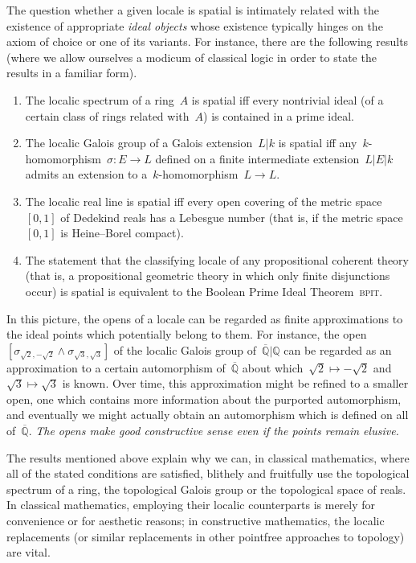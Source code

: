 \documentclass{ws-rv9x6}
\newcommand{\QQ}{\mathbb{Q}}
\renewcommand{\_}{\mathpunct{.}}
\newcommand{\?}{\,{:}\,}
\newcommand{\BPIT}{\textsc{bpit}\xspace}
\begin{document}
The question whether a given locale is spatial is intimately related with the
existence of appropriate \emph{ideal objects} whose existence typically hinges
on the axiom of choice or one of its variants. For instance, there are the
following results (where we allow ourselves a modicum of classical logic in
order to state the results in a familiar form).
\begin{enumerate}
\item The localic spectrum of a ring~$A$ is spatial iff every nontrivial ideal
(of a certain class of rings related with~$A$) is contained in a prime ideal.
\item The localic Galois group of a Galois extension~$L|k$ is spatial iff
any~$k$-homomorphism~$\sigma : E \to L$ defined on a finite intermediate
extension~$L|E|k$ admits an extension to a~$k$-homomorphism~$L \to L$.
\item The localic real line is spatial iff every open covering of the
metric space~$[0,1]$ of Dedekind reals has a Lebesgue number (that is, if the
metric space~$[0,1]$ is Heine--Borel compact).
\item The statement that the classifying locale of any propositional coherent
theory (that is, a propositional geometric theory in which only finite
disjunctions occur) is spatial is equivalent to the Boolean Prime Ideal
Theorem~\BPIT.
\end{enumerate}

In this picture, the opens of a locale can be regarded as finite approximations
to the ideal points which potentially belong to them. For instance, the
open~$[\sigma_{\sqrt{2},-\sqrt{2}} \wedge \sigma_{\sqrt{3},\sqrt{3}}]$
of the localic Galois group of~$\overline{\QQ}|\QQ$ can be regarded as an
approximation to a certain automorphism of~$\overline{\QQ}$ about
which~$\sqrt{2} \mapsto -\sqrt{2}$ and~$\sqrt{3} \mapsto \sqrt{3}$ is known. Over time, this
approximation might be refined to a smaller open, one which contains more
information about the purported automorphism, and eventually we might actually
obtain an automorphism which is defined on all of~$\overline{\QQ}$. \emph{The opens
make good constructive sense even if the points remain elusive.}

The results mentioned above explain why we can, in classical mathematics, where all of the stated
conditions are satisfied, blithely and fruitfully use the topological
spectrum of a ring, the topological Galois group or the topological space of
reals. In classical mathematics, employing their localic counterparts is merely
for convenience or for aesthetic reasons; in constructive mathematics, the
localic replacements (or similar replacements in other pointfree approaches to
topology) are vital.
\end{document}
